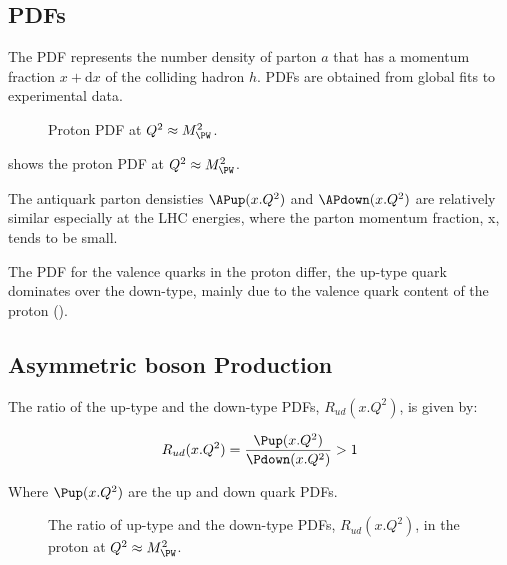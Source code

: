 
\subsection{\acp{PDF}} 
The \ac{PDF} represents the number density of parton $a$ that has a momentum
fraction $x+\mathrm{d}x$ of the colliding hadron $h$.  \acp{PDF} are obtained
from global fits to experimental data. %

\begin{figure}[htb]
  \centering
  \caption{Proton PDF at $Q^2\approx M_{\PW}^2$.}
  \label{wbos:pdf}
\end{figure}

 shows the proton PDF at $Q^2\approx M_{\PW}^2$. 

The antiquark parton densisties $\APup(x.Q^2)$ and $\APdown(x.Q^2)$ are
relatively similar especially at the LHC energies, where the parton momentum
fraction, x, tends to be small.

The \ac{PDF} for the valence quarks in the proton differ, the up-type quark
dominates over the down-type, mainly due to the valence quark content of the
proton (\HepProcess{\Pup\Pup\Pdown}). 

\subsection{Asymmetric \PW boson Production} 

The ratio of the up-type and the down-type \acp{PDF}, $R_{ud}(x.Q^2)$, is given
by:

\begin{equation}
  R_{ud}(x.Q^2) = \frac{\Pup(x.Q^2)}{ \Pdown(x.Q^2)} > 1
\end{equation}

Where $\Pup(x.Q^2)$ are the up and down quark \acp{PDF}.

\begin{figure}[htb]
  \centering
  \caption{The ratio of up-type and the down-type \acp{PDF}, $R_{ud}(x.Q^2)$,
  in the proton at $Q^2\approx M_{\PW}^2$.}
  \label{wbos:pdfrat}
\end{figure}

